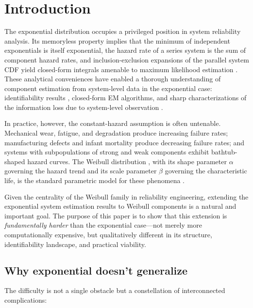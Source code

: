 \documentclass[12pt]{article}
\theoremstyle{definition}
\theoremstyle{remark}
\begin{document}
\section{Introduction}
\label{sec:introduction}

The exponential distribution occupies a privileged position in
system reliability analysis.  Its memoryless property implies that
the minimum of independent exponentials is itself exponential, the
hazard rate of a series system is the sum of component hazard
rates, and inclusion-exclusion expansions of the parallel system CDF
yield closed-form integrals amenable to maximum likelihood
estimation \citep{Towell2026}.  These analytical conveniences have
enabled a thorough understanding of component estimation from
system-level data in the exponential case: identifiability results
\citep{BasuGhosh1980}, closed-form EM algorithms, and sharp
characterizations of the information loss due to system-level
observation \citep{Towell2026}.

In practice, however, the constant-hazard assumption is often
untenable.  Mechanical wear, fatigue, and degradation produce
increasing failure rates; manufacturing defects and infant mortality
produce decreasing failure rates; and systems with subpopulations of
strong and weak components exhibit bathtub-shaped hazard curves.
The Weibull distribution \citep{Weibull1951}, with its shape
parameter $\alpha$ governing the hazard trend and its scale
parameter $\beta$ governing the characteristic life, is the standard
parametric model for these phenomena \citep{MeekerEscobar1998,
LawlessBook2003}.

Given the centrality of the Weibull family in reliability
engineering, extending the exponential system estimation results to
Weibull components is a natural and important goal.  The purpose of
this paper is to show that this extension is \emph{fundamentally
harder} than the exponential case---not merely more computationally
expensive, but qualitatively different in its structure,
identifiability landscape, and practical viability.

\subsection*{Why exponential doesn't generalize}

The difficulty is not a single obstacle but a constellation of
interconnected complications:
\end{document}
